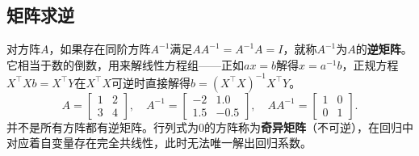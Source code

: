 \subsection{矩阵求逆}
对方阵$A$，如果存在同阶方阵$A^{-1}$满足$AA^{-1}=A^{-1}A=I$，就称$A^{-1}$为$A$的\textbf{逆矩阵}。它相当于数的倒数，用来解线性方程组——正如$ax=b$解得$x=a^{-1}b$，正规方程$X^\top Xb=X^\top Y$在$X^\top X$可逆时直接解得$b=(X^\top X)^{-1}X^\top Y$。
\[
A=\begin{bmatrix}1&2\\3&4\end{bmatrix},\quad
A^{-1}=\begin{bmatrix}-2&1.0\\1.5&-0.5\end{bmatrix},\quad
AA^{-1}=\begin{bmatrix}1&0\\0&1\end{bmatrix}.
\]
并不是所有方阵都有逆矩阵。行列式为0的方阵称为\textbf{奇异矩阵}（不可逆），在回归中对应着自变量存在完全共线性，此时无法唯一解出回归系数。

